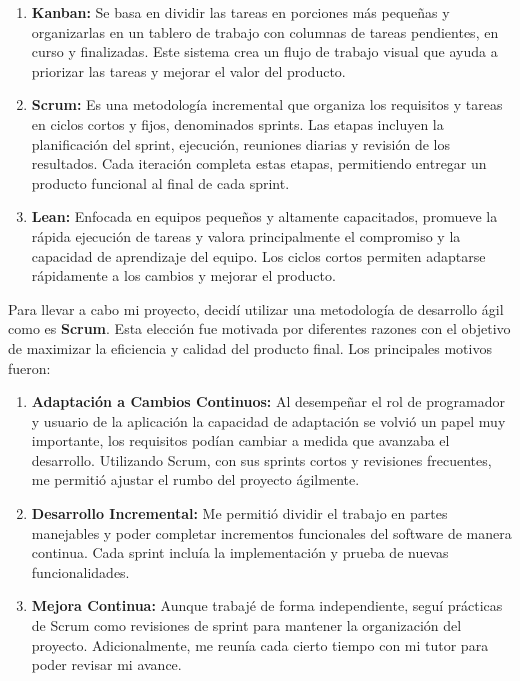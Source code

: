 \begin{enumerate}
    \item \textbf{Kanban:} Se basa en dividir las tareas en porciones más pequeñas y organizarlas en un tablero de trabajo con columnas de tareas pendientes, en curso y finalizadas. Este sistema crea un flujo de trabajo visual que ayuda a priorizar las tareas y mejorar el valor del producto.

    \item \textbf{Scrum:} Es una metodología incremental que organiza los requisitos y tareas en ciclos cortos y fijos, denominados sprints. Las etapas incluyen la planificación del sprint, ejecución, reuniones diarias y revisión de los resultados. Cada iteración completa estas etapas, permitiendo entregar un producto funcional al final de cada sprint.

    \item \textbf{Lean:} Enfocada en equipos pequeños y altamente capacitados, promueve la rápida ejecución de tareas y valora principalmente el compromiso y la capacidad de aprendizaje del equipo. Los ciclos cortos permiten adaptarse rápidamente a los cambios y mejorar el producto.
\end{enumerate}

Para llevar a cabo mi proyecto, decidí utilizar una metodología de desarrollo ágil como es \textbf{Scrum}. Esta elección fue motivada por diferentes razones con el objetivo de maximizar la eficiencia y calidad del producto final. Los principales motivos fueron:

\begin{enumerate}
    \item \textbf{Adaptación a Cambios Continuos:} Al desempeñar el rol de programador y usuario de la aplicación la capacidad de adaptación se volvió un papel muy importante, los requisitos podían cambiar a medida que avanzaba el desarrollo. Utilizando Scrum, con sus sprints cortos y revisiones frecuentes, me permitió ajustar el rumbo del proyecto ágilmente.

    \item \textbf{Desarrollo Incremental:} Me permitió dividir el trabajo en partes manejables y poder completar incrementos funcionales del software de manera continua. Cada sprint incluía la implementación y prueba de nuevas funcionalidades.

    \item \textbf{Mejora Continua:} Aunque trabajé de forma independiente, seguí prácticas de Scrum como revisiones de sprint para mantener la organización del proyecto. Adicionalmente, me reunía cada cierto tiempo con mi tutor para poder revisar mi avance.

\end{enumerate}



